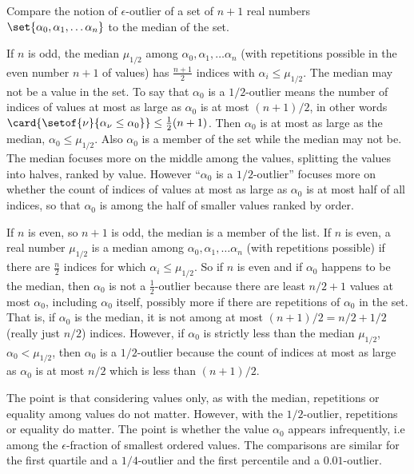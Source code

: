 \documentclass[12pt]{article}
\begin{document}
\begin{exercise}
    Compare the notion of \( \epsilon \)-outlier of a set of \( n+1 \)
    real numbers \( \set{\alpha_0, \alpha_1, \dots \alpha_n} \) to the
    median of the set.
\end{exercise}
\begin{solution}
    If \( n \) is odd, the median \( \mu_{1/2} \) among \( \alpha_0,
    \alpha_1, \dots \alpha_n \) (with repetitions possible in the even
    number \( n+1 \) of values) has \( \frac {n+1}{2} \) indices with
    \( \alpha_i \le \mu_{1/2} \).  The median may not be a value
    in the set.  To say that \( \alpha_0 \) is a \( 1/2 \)-outlier means
    the number of indices of values at most as large as \( \alpha_0 \)
    is at most \( (n+1)/2 \), in other words \( \card{%
    \setof{\nu}{\alpha_{\nu} \le \alpha_0}} \le \frac{1}{2}(n+1) \).
    Then \( \alpha_0 \) is at most as large as the median, \( \alpha_0
    \le \mu_{1/2} \).  Also \( \alpha_0 \) is a member of the set while
    the median may not be.  The median focuses more on the middle among
    the values, splitting the values into halves, ranked by value.
    However ``\( \alpha_0 \) is a \( 1/2 \)-outlier'' focuses more on
    whether the count of indices of values at most as large as \( \alpha_0
    \) is at most half of all indices, so that \( \alpha_0 \) is among
    the half of smaller values ranked by order.

    If \( n \) is even, so \( n + 1 \) is odd, the median is a member of
    the list.  If \( n \) is even, a real number \( \mu_{1/2} \) is a
    median among \( \alpha_0, \alpha_1, \dots \alpha_n \) (with
    repetitions possible) if there are \( \frac{n}{2} \) indices for
    which \( \alpha_i \le \mu_ {1/2} \).  So if \( n \) is even and if \(
    \alpha_0 \) happens to be the median, then \( \alpha_0 \) is not a \(
    \frac{1}{2} \)-outlier because there are least \( n/2 + 1 \)
    values at most \( \alpha_0 \), including \( \alpha_0 \) itself,
    possibly more if there are repetitions of \( \alpha_0 \) in the set.  That is, if \(
    \alpha_0 \) is the median, it is not among at most \( (n+1)/2 = n/2
    + 1/2 \) (really just \( n/2 \)) indices.  However, if \( \alpha_0 \)
    is strictly less than the median \( \mu_{1/2} \), \( \alpha_0 < \mu_{1/2}
    \), then \( \alpha_0 \) is a \( 1/2 \)-outlier because the count of
    indices at most as large as \( \alpha_0 \) is at most \( n/2 \)
    which is less than \( (n+1)/2 \).

    The point is that considering values only, as with the median,
    repetitions or equality among values do not matter.  However, with
    the \( 1/2 \)-outlier, repetitions or equality do matter.  The point
    is whether the value \( \alpha_0 \) appears infrequently, i.e among
    the \( \epsilon \)-fraction of smallest ordered values. The
    comparisons are similar for the first quartile and a \( 1/4 \)-outlier
    and the first percentile and a \( 0.01 \)-outlier.
\end{solution}
\end{document}
